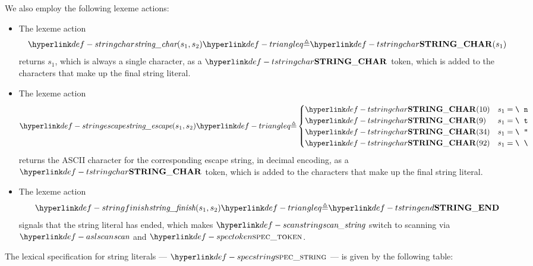 \begin{mathpar}
\end{mathpar}

We also employ the following lexeme actions:
\begin{itemize}
\item
\hypertarget{def-stringchar}{}
The lexeme action
\[
\stringchar(s_1, s_2) \triangleq \Tstringchar(s_1)
\]
returns $s_1$, which is always a single character, as a $\Tstringchar$
token, which is added to the characters that make up the final string
literal.

\item
\hypertarget{def-stringescape}{}
The lexeme action
\[
\stringescape(s_1, s_2) \triangleq \begin{cases}
  \Tstringchar(10) & s_1 = \texttt{\textbackslash\;\;n}\\
  \Tstringchar(9) & s_1 = \texttt{\textbackslash\;\;t}\\
  \Tstringchar(34) & s_1 = \texttt{\textbackslash\;\;"}\\
  \Tstringchar(92) & s_1 = \texttt{\textbackslash\;\;\textbackslash}\\
\end{cases}
\]
returns the ASCII character for the corresponding escape string, in decimal encoding,
as a $\Tstringchar$ token, which is added to the characters that make up the final string
literal.

\item
\hypertarget{def-stringfinish}{}
The lexeme action
\[
\stringfinish(s_1, s_2) \triangleq \Tstringend
\]
signals that the string literal has ended, which makes $\scanstring$
switch to scanning via $\aslscan$ and $\spectoken$.
\end{itemize}

\hypertarget{def-specstring}{}
The lexical specification for string literals --- $\specstring$ --- is given by the following table:

